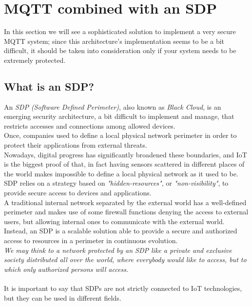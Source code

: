 \documentclass[12pt]{report}
\begin{document}
{\section{MQTT combined with an SDP}
\bigskip
In this section we will see a sophisticated solution to implement a very secure MQTT system; since this architecture's implementation seems to be a bit difficult, it should be taken into consideration only if your system needs to be extremely protected.\\

\subsection{What is an SDP?}
\bigskip
An \emph{SDP (Software Defined Perimeter)}, also known as \emph{Black Cloud}, is an emerging security architecture, a bit difficult to implement and manage, that restricts accesses and connections among allowed devices.\\
Once, companies used to define a local physical network perimeter in order to protect their applications from external threats.\\
Nowadays, digital progress has significantly broadened these boundaries, and IoT is the biggest proof of that, in fact having sensors scattered in different places of the world makes impossible to define a local physical network as it used to be.\\

SDP relies on a strategy based on \emph{"hidden-resources"}, or \emph{"non-visibility"}, to provide secure access to devices and applications.\\
A traditional internal network separated by the external world has a well-defined perimeter and makes use of some firewall functions denying the access to external users, but allowing internal ones to communicate with the external world.\\
Instead, an SDP is a scalable solution able to provide a secure and authorized access to resources in a perimeter in continuous evolution.\\

\emph{We may think to a network protected by an SDP like a private and exclusive society distributed all over the world, where everybody would like to access, but to which only authorized persons will access.}\\\\
It is important to say that SDPs are not strictly connected to IoT technologies, but they can be used in different fields.\\

}
\end{document}
